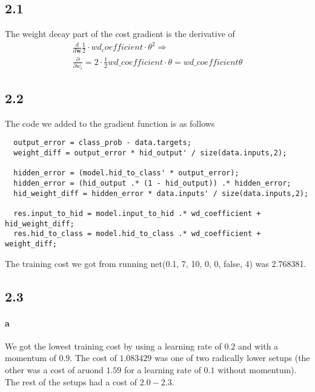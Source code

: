 \documentclass{article}
\begin{document}
\subsection*{2.1}


The weight decay part of the cost gradient is the derivative of
\begin{align}
  \frac{d}{d\mathbf{w}}\frac{1}{2}\cdot wd_coefficient \cdot \theta^2 \Rightarrow \\
  \nonumber \frac{\partial}{\partial w_i} = 2 \cdot \frac{1}{2} wd\_coefficient \cdot \theta = wd\_coefficient \theta
\end{align}

\subsection*{2.2}

The code we added to the gradient function is as follows

\begin{verbatim}
  output_error = class_prob - data.targets;
  weight_diff = output_error * hid_output' / size(data.inputs,2);

  hidden_error = (model.hid_to_class' * output_error);
  hidden_error = (hid_output .* (1 - hid_output)) .* hidden_error;
  hid_weight_diff = hidden_error * data.inputs' / size(data.inputs,2);

  res.input_to_hid = model.input_to_hid .* wd_coefficient + hid_weight_diff;
  res.hid_to_class = model.hid_to_class .* wd_coefficient + weight_diff;
\end{verbatim}

The training cost we got from running net(0.1, 7, 10, 0, 0, false, 4) was 2.768381.

\subsection*{2.3}

\paragraph{a}

We got the lowest training cost by using a learning rate of $0.2$ and with a
momentum of $0.9$. The cost of $1.083429$ was one of two radically lower setups
(the other was a cost of aruond $1.59$ for a learning rate of $0.1$ without
momentum). The rest of the setups had a cost of $2.0 - 2.3$.
\end{document}
